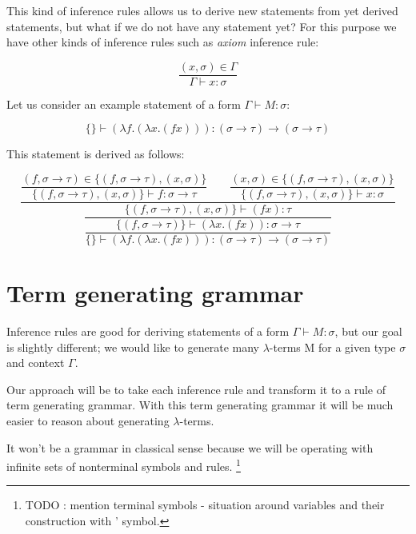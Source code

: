 \documentclass[12pt,a4paper]{report}
\newcommand{\Lets}{Let us }
\newcommand{\lterms}{$\lambda$-terms\xspace}
\newcommand{\turst}[3]{$#1 \vdash #2 : #3$\xspace}
\newcommand{\GMS}{\turst{\Gamma}{M}{\sigma}}
\begin{document}
	This kind of inference rules allows us to derive new statements from yet derived statements, but 
	what if we do not have any statement yet? 
	For this purpose we have other kinds of inference rules such as {\it axiom} inference rule:   
	
	\begin{equation*}
		\frac{( x , \sigma )  \in \Gamma}
		     {\Gamma \vdash x : \sigma}
	\end{equation*}	
	
	\Lets consider an example statement of a form \GMS :
	
	\[
		\{\} \vdash (\lambda f . (\lambda x . (f x) )) : 
		(\sigma \rightarrow \tau) \rightarrow ( \sigma \rightarrow \tau ) 
	\]
		
	This statement is derived as follows: 
	
	\begin{equation*}
	\dfrac{
		\dfrac{ (f,\sigma \rightarrow \tau) \in \{ (f,\sigma \rightarrow \tau) , (x,\sigma)  \}  }
		     { \{ (f,\sigma \rightarrow \tau) , (x,\sigma)  \} \vdash f : \sigma \rightarrow \tau }
		\qquad
		\dfrac{ (x,\sigma) \in \{ (f,\sigma \rightarrow \tau) , (x,\sigma)  \}  }
		     { \{ (f,\sigma \rightarrow \tau) , (x,\sigma)  \} \vdash x : \sigma }
		 }
		 {
			\dfrac{		 	
		 		\{ (f,\sigma \rightarrow \tau) , (x,\sigma)  \} \vdash (f x) : \tau
		 	}{
				\dfrac{\{ (f,\sigma \rightarrow \tau) \} \vdash (\lambda x . (f x) ) : 
				\sigma \rightarrow \tau}
				{ \{ \} \vdash (\lambda f . (\lambda x . (f x) ) ) 
				  : (\sigma \rightarrow \tau) \rightarrow (\sigma \rightarrow \tau) }
		 	}
		 }
	\end{equation*}		
	
\section{Term generating grammar}

Inference rules are good for deriving statements of a form \GMS, but our
goal is slightly different; we would like to generate many \lterms M for a given type 
$\sigma$ and context $\Gamma$.

Our approach will be to take each inference rule and transform it to a rule of term generating
grammar. With this term generating grammar it will be much easier to reason about generating 
\lterms.
	
It won't be a grammar in classical sense because we will be operating with infinite sets of
nonterminal symbols and rules. \footnote{TODO : mention terminal symbols - situation around 
variables and their construction with ' symbol.}
\end{document}
